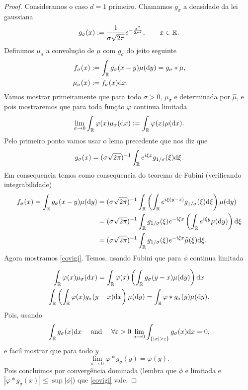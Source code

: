   \begin{proof}
   Consideramos o caso $d=1$ primeiro. Chamamos $g_{\sigma}$ a densidade da lei gaussiana
   $$ g_{\sigma}(x):=\frac{1}{\sigma \sqrt{2\pi}} e^{-\frac{x^2}{2\sigma^2}}, \qquad x \in {\ensuremath{\mathbb R}}.$$
   Definimos $\mu_{\sigma}$ a convolução de $\mu$ com $g_{\sigma}$ do jeito seguinte
   \begin{equation}
   \begin{split}
 f_{\sigma}(x)&:= \int_{{\mathbb R}} g_{\sigma}(x-y)\mu(\mathrm{d} y)= g_{\sigma}\ast\mu,\\
 \mu_{\sigma}(x)&:= f_{\sigma}(x) \mathrm{d} x.
   \end{split}
 \end{equation}
Vamos mostrar primeiramente que para todo $\sigma>0$,  $\mu_{\sigma}$ e determinada por $\hat \mu$, e pois mostraremos que para
toda função $\varphi$ continua limitada
   \begin{equation}\label{covigi}
  \lim_{\sigma \to 0} \int_{{\mathbb R}} \varphi(x)\mu_{\sigma}( \mathrm{d} x):= \int_{{\mathbb R}} \varphi(x)\mu( \mathrm{d} x ).
   \end{equation}
Pelo primeiro ponto vamos usar o lema precedente que nos diz que
\begin{equation}
 g_{\sigma}(x)= (\sigma \sqrt{2\pi})^{-1} \int_{{\mathbb R}} e^{i\xi x} g_{1/\sigma}(\xi) \mathrm{d} \xi.
\end{equation}
Em consequencia temos como consequencia do teorema de Fubini (verificando integrabilidade)
\begin{equation}\begin{split}
 f_{\sigma}(x)= \int_{{\mathbb R}}g_{\sigma}(x-y)\mu(\mathrm{d} y)&=
 (\sigma \sqrt{2\pi})^{-1} \int_{{\mathbb R}}\left(\int_{{\mathbb R}} e^{i\xi(y-x)} g_{1/\sigma}(\xi)  \mathrm{d} \xi\right) \mu(\mathrm{d} y) \\
 &= (\sigma \sqrt{2\pi})^{-1} \int_{{\mathbb R}} g_{1/\sigma}(\xi) e^{-i\xi x} \left(\int_{{\mathbb R}} e^{i\xi y}  \mu(\mathrm{d} y) \right) \mathrm{d} \xi \\
 &=(\sigma \sqrt{2\pi})^{-1} \int_{{\mathbb R}} g_{1/\sigma}(\xi) e^{-i\xi x} \widehat\mu(\xi) \mathrm{d} \xi.
\end{split}
 \end{equation}
Agora mostramos \eqref{covigi}. Temos, usando Fubini que para $\phi$ continua limitada

\begin{multline}
 \int_{{\mathbb R}} \varphi(x)\mu_{\sigma}( \mathrm{d} x)= \int_{{\mathbb R}} \varphi(x) \left(\int_{{\mathbb R}} g_\sigma(y-x) \mu(\mathrm{d} y)\right) \mathrm{d} x \\
   \int_{{\mathbb R}} \left( \int_{{\mathbb R}} \varphi(x)  g_\sigma(y-x) \mathrm{d} x \right) \mu(\mathrm{d} y)=  \int_{{\mathbb R}}  \varphi\ast g_\sigma(y) \mu(\mathrm{d} y).
 \end{multline}
Pois, usando
\begin{equation}
 \int_{\bbR} g_\sigma(x) \dd x \quad \text{ and } \quad \forall \gep>0  \, \lim_{\sigma\to 0} \int_{\{ |x|>\gep \}} g_\sigma(x) \dd x=0,
\end{equation}
e facil mostrar que para todo $y$
\begin{equation}
  \lim_{\sigma \to 0} \varphi\ast g_\sigma(y)=\varphi(y).
\end{equation}
Pois concluimos por convergência dominada (lembra que $\phi$ e limitada e $|\varphi\ast g_\sigma(x)|\le \sup |\phi|$) que \eqref{covigi} vale.


\end{proof}

